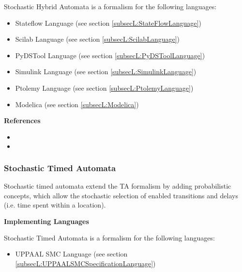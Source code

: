 Stochastic Hybrid Automata is a formalism for the following languages:
\begin{itemize}
	\item Stateflow Language (see section \ref{subsecL:StateFlowLanguage})
	\item Scilab Language (see section \ref{subsecL:ScilabLanguage})
	\item PyDSTool Language (see section \ref{subsecL:PyDSToolLanguage})
	\item Simulink Language (see section \ref{subsecL:SimulinkLanguage})
	\item Ptolemy Language (see section \ref{subsecL:PtolemyLanguage})
	\item Modelica (see section \ref{subsecL:Modelica})
\end{itemize}





\textbf{References}
\begin{itemize}
	
\item {}
	
\item {}
\end{itemize}



\subsubsection{Stochastic Timed Automata}
\label{subsecF:TimedAutomataStochastic}


Stochastic timed automata extend the TA formalism by adding probabilistic concepts, which allow the stochastic selection of enabled transitions and delays (i.e. time spent within a location).

\textbf{Implementing Languages}

Stochastic Timed Automata is a formalism for the following languages:
\begin{itemize}
	\item UPPAAL SMC Language (see section \ref{subsecL:UPPAALSMCSpecificationLanguage})
\end{itemize}


